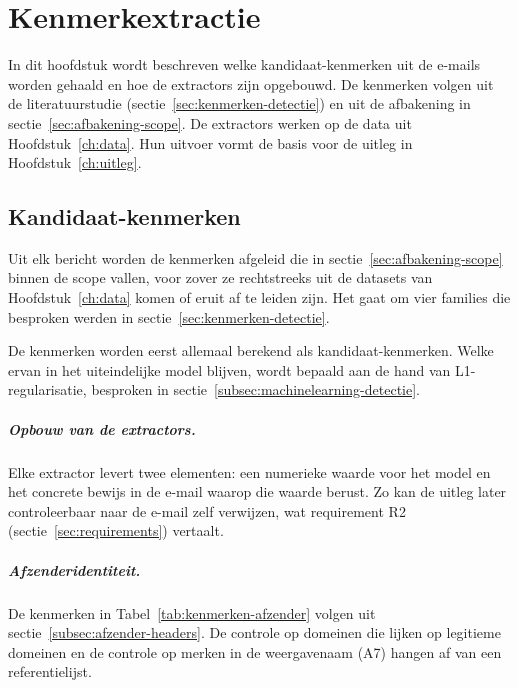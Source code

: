 \chapter{Kenmerkextractie}%
\label{ch:kenmerkextractie}

In dit hoofdstuk wordt beschreven welke kandidaat-kenmerken uit de e-mails worden gehaald en hoe de extractors zijn opgebouwd. De kenmerken volgen uit de literatuurstudie (sectie~\ref{sec:kenmerken-detectie}) en uit de afbakening in sectie~\ref{sec:afbakening-scope}. De extractors werken op de data uit Hoofdstuk~\ref{ch:data}. Hun uitvoer vormt de basis voor de uitleg in Hoofdstuk~\ref{ch:uitleg}.

\section{Kandidaat-kenmerken}%
\label{sec:kandidaat-kenmerken}

Uit elk bericht worden de kenmerken afgeleid die in sectie~\ref{sec:afbakening-scope} binnen de scope vallen, voor zover ze rechtstreeks uit de datasets van Hoofdstuk~\ref{ch:data} komen of eruit af te leiden zijn. Het gaat om vier families die besproken werden in sectie~\ref{sec:kenmerken-detectie}.

De kenmerken worden eerst allemaal berekend als kandidaat-kenmerken. Welke ervan in het uiteindelijke model blijven, wordt bepaald aan de hand van L1-regularisatie, besproken in sectie~\ref{subsec:machinelearning-detectie}.

\paragraph{Opbouw van de extractors.}
Elke extractor levert twee elementen: een numerieke waarde voor het model en het concrete bewijs in de e-mail waarop die waarde berust. Zo kan de uitleg later controleerbaar naar de e-mail zelf verwijzen, wat requirement R2 (sectie~\ref{sec:requirements}) vertaalt.

\paragraph{Afzenderidentiteit.}
De kenmerken in Tabel~\ref{tab:kenmerken-afzender} volgen uit sectie~\ref{subsec:afzender-headers}. De controle op domeinen die lijken op legitieme domeinen en de controle op merken in de weergavenaam (A7) hangen af van een referentielijst.


